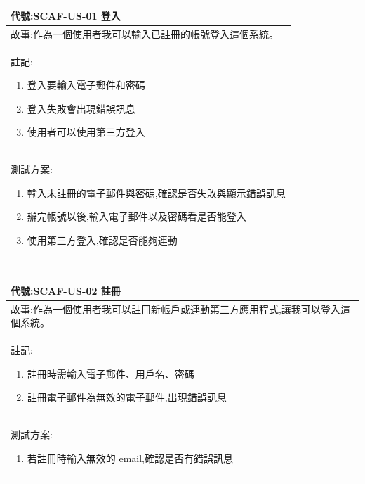 \documentclass{report}
\begin{document}

\subsection*{}
\fontsize{12}{20}\selectfont
\begin{tabularx}{\textwidth}{|X|}
  \hline
  代號:SCAF-US-01 登入\\ \hline
  故事:作為一個使用者我可以輸入已註冊的帳號登入這個系統。 \\ \hline
  註記:
  \begin{enumerate}
    \item 登入要輸入電子郵件和密碼
    \item 登入失敗會出現錯誤訊息
    \item 使用者可以使用第三方登入 
  \end{enumerate} \\ \hline
  測試方案:
  \begin{enumerate}
    \item 輸入未註冊的電子郵件與密碼,確認是否失敗與顯示錯誤訊息
    \item 辦完帳號以後,輸入電子郵件以及密碼看是否能登入
    \item 使用第三方登入,確認是否能夠連動
  \end{enumerate} \\ \hline
\end{tabularx}

\subsection*{}
\fontsize{12}{20}\selectfont
\begin{tabularx}{\textwidth}{|X|}
  \hline
  代號:SCAF-US-02 註冊 \\ \hline
  故事:作為一個使用者我可以註冊新帳戶或連動第三方應用程式,讓我可以登入這個系統。 \\ \hline
  註記:
  \begin{enumerate}
    \item 註冊時需輸入電子郵件、用戶名、密碼
    \item 註冊電子郵件為無效的電子郵件,出現錯誤訊息
  \end{enumerate} \\ \hline
  測試方案:
  \begin{enumerate}
    \item 若註冊時輸入無效的 email,確認是否有錯誤訊息
  \end{enumerate} \\ \hline
\end{tabularx}
\end{document}
